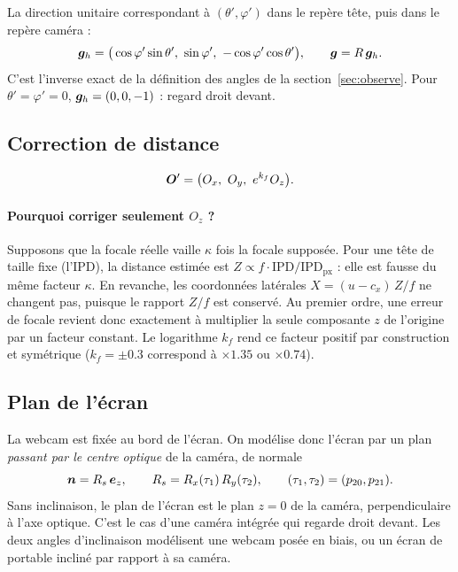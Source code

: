 La direction unitaire correspondant à $(\theta', \varphi')$ dans le repère tête, puis dans le repère caméra :
\begin{equation}
  \vect{g}_h = \big(\cos\varphi'\sin\theta',\ \sin\varphi',\ -\cos\varphi'\cos\theta'\big), \qquad \vect{g} = R\,\vect{g}_h .
\end{equation}
C'est l'inverse exact de la définition des angles de la section~\ref{sec:observe}. Pour $\theta' = \varphi' = 0$, $\bm{g}_h = (0, 0, -1)$ : regard droit devant.

\subsection{Correction de distance}
\label{sec:focale}

\begin{equation}
  \bm{O}' = \big(O_x,\ O_y,\ e^{k_f} O_z\big).
\end{equation}

\paragraph{Pourquoi corriger seulement $O_z$ ?} Supposons que la focale réelle vaille $\kappa$ fois la focale supposée. Pour une tête de taille fixe (l'IPD), la distance estimée est $Z \propto f\cdot\text{IPD}/\text{IPD}_\text{px}$ : elle est fausse du même facteur $\kappa$. En revanche, les coordonnées latérales $X = (u - c_x)\,Z / f$ ne changent pas, puisque le rapport $Z/f$ est conservé. Au premier ordre, une erreur de focale revient donc exactement à multiplier la seule composante $z$ de l'origine par un facteur constant. Le logarithme $k_f$ rend ce facteur positif par construction et symétrique ($k_f = \pm\num{0.3}$ correspond à $\times\num{1.35}$ ou $\times\num{0.74}$).

\subsection{Plan de l'écran}

La webcam est fixée au bord de l'écran. On modélise donc l'écran par un plan \emph{passant par le centre optique} de la caméra, de normale
\begin{equation}
  \bm{n} = R_s\,\bm{e}_z, \qquad R_s = R_x(\tau_1)\,R_y(\tau_2), \qquad (\tau_1, \tau_2) = (p_{20}, p_{21}).
\end{equation}
Sans inclinaison, le plan de l'écran est le plan $z = 0$ de la caméra, perpendiculaire à l'axe optique. C'est le cas d'une caméra intégrée qui regarde droit devant. Les deux angles d'inclinaison modélisent une webcam posée en biais, ou un écran de portable incliné par rapport à sa caméra.

